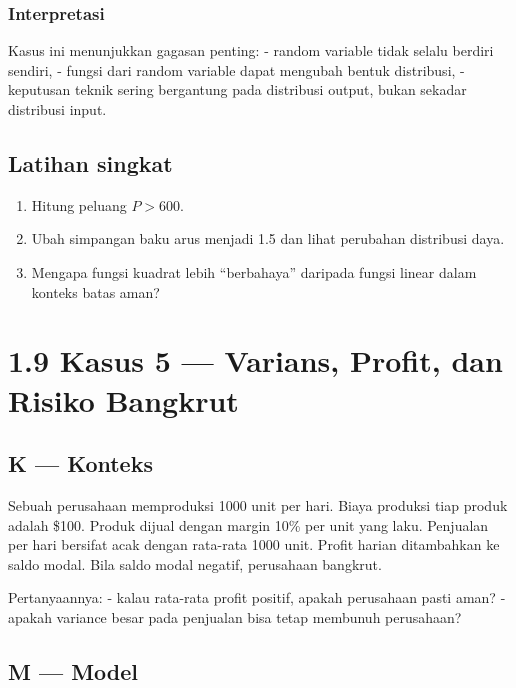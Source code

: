 \documentclass[
  letterpaper,
  DIV=11,
  numbers=noendperiod]{scrreprt}
\providecommand{\tightlist}{%
  \setlength{\itemsep}{0pt}\setlength{\parskip}{0pt}}
\begin{document}
\subsubsection{Interpretasi}\label{interpretasi-3}

Kasus ini menunjukkan gagasan penting: - random variable tidak selalu
berdiri sendiri, - fungsi dari random variable dapat mengubah bentuk
distribusi, - keputusan teknik sering bergantung pada distribusi output,
bukan sekadar distribusi input.

\subsection{Latihan singkat}\label{latihan-singkat-3}

\begin{enumerate}
\def\labelenumi{\arabic{enumi}.}
\tightlist
\item
  Hitung peluang \(P > 600\).
\item
  Ubah simpangan baku arus menjadi 1.5 dan lihat perubahan distribusi
  daya.
\item
  Mengapa fungsi kuadrat lebih ``berbahaya'' daripada fungsi linear
  dalam konteks batas aman?
\end{enumerate}

\section{1.9 Kasus 5 --- Varians, Profit, dan Risiko
Bangkrut}\label{kasus-5-varians-profit-dan-risiko-bangkrut}

\subsection{K --- Konteks}\label{k-konteks-5}

Sebuah perusahaan memproduksi 1000 unit per hari. Biaya produksi tiap
produk adalah \$100. Produk dijual dengan margin 10\% per unit yang
laku. Penjualan per hari bersifat acak dengan rata-rata 1000 unit.
Profit harian ditambahkan ke saldo modal. Bila saldo modal negatif,
perusahaan bangkrut.

Pertanyaannya: - kalau rata-rata profit positif, apakah perusahaan pasti
aman? - apakah variance besar pada penjualan bisa tetap membunuh
perusahaan?

\subsection{M --- Model}\label{m-model-5}
\end{document}
